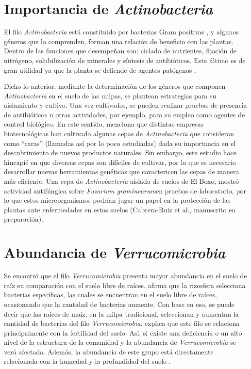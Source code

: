 \documentclass[12pt,letterpaper,oneside]{report}
\begin{document}
\section{Importancia de \textit{Actinobacteria}}
El filo \textit{Actinobacteria} está constituido por bacterias Gram positivas \autocite{Kirchman2012}, y algunos géneros que lo comprenden, forman una relación de beneficio con las plantas. Dentro de las funciones que desempeñan son: ciclado de nutrientes, fijación de nitrógeno, solubilización de minerales y síntesis de antibióticos. Este último es de gran utilidad ya que la planta se defiende de agentes patógenos \autocite{Barka2015}.
\par
Dicho lo anterior, mediante la determinación de los géneros que componen \textit{Actinobacteria} en el suelo de las milpas, se plantean estrategias para su aislamiento y cultivo. Una vez cultivados, se pueden realizar pruebas de presencia de antibióticos u otras actividades, por ejemplo, para su empleo como agentes de control biológico. En este sentido, \textcite{van-der-Heul2018} menciona que distintas empresas biotecnológicas han cultivado algunas cepas de \textit{Actinobacteria} que consideran como “raras” (llamadas así por lo poco estudiadas) dada su importancia en el descubrimiento de nuevos productos naturales. Sin embargo, este estudio hace hincapié en que diversas cepas son difíciles de cultivar, por lo que es necesario desarrollar nuevas herramientas genéticas que caractericen las cepas de manera más eficiente. Una cepa de \textit{Actinobacteria} aislada de suelos de El Boxo, mostró actividad antifúngica sobre \textit{Fuzarium graminearum}en pruebas de laboratorio, por lo que estos microorganismos podrían jugar un papel en la protección de las plantas ante enfermedades en estos suelos (Cabrera-Ruiz et al., manuscrito en preparación). 
\section{Abundancia de \textit{Verrucomicrobia}}
Se encontró que el filo \textit{Verrucomicrobia} presenta mayor abundancia en el suelo de raíz en comparación con el suelo libre de raíces. \textcite{Lopes2016} afirma que la rizosfera selecciona bacterias específicas, las cuales se encuentran en el suelo libre de raíces, ocasionando que la cantidad de bacterias aumente. Con base en eso, se puede decir que las raíces de maíz, en la milpa tradicional, seleccionan y aumentan la cantidad de bacterias del filo \textit{Verrucomicrobia}. \textcite{Navarrete2015} explica que este filo se relaciona principalmente con la fertilidad del suelo. Así, si existe una deficiencia o un alto nivel de  la estructura de la comunidad y la abundancia de \textit{Verrucomicrobia} se verá afectada. Además, la abundancia de este grupo está directamente relacionada con la humedad y la profundidad del suelo \autocite{Buckley2001}.
\newpage
\end{document}
